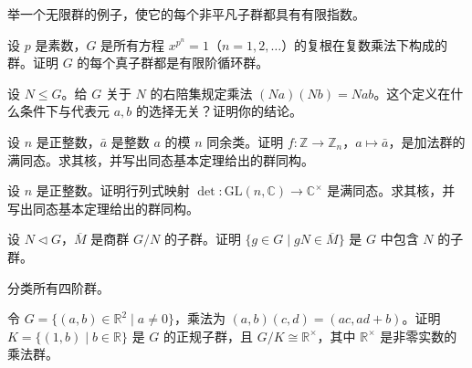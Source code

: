 \noindent\begin{minipage}{\textwidth}
举一个无限群的例子，使它的每个非平凡子群都具有有限指数。
\end{minipage}\par\vfill
\noindent\begin{minipage}{\textwidth}
设 $p$ 是素数，$G$ 是所有方程 $x^{p^n}=1$（$n=1,2,\ldots$）的复根在复数乘法下构成的群。证明 $G$ 的每个真子群都是有限阶循环群。
\end{minipage}\par\vfill
\newpage
\noindent\begin{minipage}{\textwidth}
设 $N\le G$。给 $G$ 关于 $N$ 的右陪集规定乘法 $(Na)(Nb)=Nab$。这个定义在什么条件下与代表元 $a,b$ 的选择无关？证明你的结论。
\end{minipage}\par\vfill
\noindent\begin{minipage}{\textwidth}
设 $n$ 是正整数，$\bar a$ 是整数 $a$ 的模 $n$ 同余类。证明 $f:\mathbb Z\to\mathbb Z_n$，$a\mapsto\bar a$，是加法群的满同态。求其核，并写出同态基本定理给出的群同构。
\end{minipage}\par\vfill
\noindent\begin{minipage}{\textwidth}
设 $n$ 是正整数。证明行列式映射 $\det:\mathrm{GL}(n,\mathbb C)\to\mathbb C^\times$ 是满同态。求其核，并写出同态基本定理给出的群同构。
\end{minipage}\par\vfill
\newpage
\noindent\begin{minipage}{\textwidth}
设 $N\triangleleft G$，$\overline M$ 是商群 $G/N$ 的子群。证明 $\{g\in G\mid gN\in\overline M\}$ 是 $G$ 中包含 $N$ 的子群。
\end{minipage}\par\vfill
\noindent\begin{minipage}{\textwidth}
分类所有四阶群。
\end{minipage}\par\vfill
\noindent\begin{minipage}{\textwidth}
令 $G=\{(a,b)\in\mathbb R^2\mid a\ne 0\}$，乘法为 $(a,b)(c,d)=(ac,ad+b)$。证明 $K=\{(1,b)\mid b\in\mathbb R\}$ 是 $G$ 的正规子群，且 $G/K\cong\mathbb R^\times$，其中 $\mathbb R^\times$ 是非零实数的乘法群。
\end{minipage}\par\vfill
